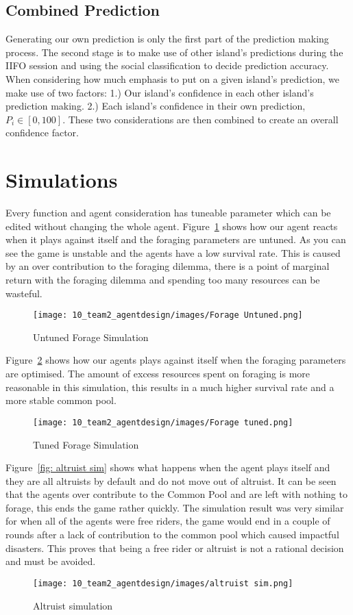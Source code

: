 \subsection{Combined Prediction}
Generating our own prediction is only the first part of the prediction making process. The second stage is to make use of other island's predictions during the IIFO session and using the social classification to decide prediction accuracy. When considering how much emphasis to put on a given island's prediction, we make use of two factors: 1.) Our island's confidence in each other island's prediction making. 2.) Each island's confidence in their own prediction, $P_i \in [0,100]$. These two considerations are then combined to create an overall confidence factor.

\section{Simulations}
Every function and agent consideration has tuneable parameter which can be edited without changing the whole agent. Figure~\ref{fig: Forage Untuned} shows how our agent reacts when it plays against itself and the foraging parameters are untuned. As you can see the game is unstable and the agents have a low survival rate. This is caused by an over contribution to the foraging dilemma, there is a point of marginal return with the foraging dilemma and spending too many resources can be wasteful. 

\begin{figure}[!htb]
    \centering
    \texttt{[image: 10\_team2\_agentdesign/images/Forage Untuned.png]}
    \caption{Untuned Forage Simulation}
    \label{fig: Forage Untuned}
\end{figure}

Figure~\ref{fig: Forage tuned} shows how our agents plays against itself when the foraging parameters are optimised. The amount of excess resources spent on foraging is more reasonable in this simulation, this results in a much higher survival rate and a more stable common pool.

\begin{figure}[!htb]
    \centering
    \texttt{[image: 10\_team2\_agentdesign/images/Forage tuned.png]}
    \caption{Tuned Forage Simulation}
    \label{fig: Forage tuned}
\end{figure}

Figure~\ref{fig: altruist sim}  shows what happens when the agent plays itself and they are all altruists by default and do not move out of altruist. It can be seen that the agents over contribute to the Common Pool and are left with nothing to forage, this ends the game rather quickly. The simulation result was very similar for when all of the agents were free riders, the game would end in a couple of rounds after a lack of contribution to the common pool which caused impactful disasters.  This proves that being a free rider or altruist is not a rational decision and must be avoided. 

\begin{figure}[!htb]
    \centering
    \texttt{[image: 10\_team2\_agentdesign/images/altruist sim.png]}
    \caption{Altruist simulation}
    \label{fig:  altruist sim}
\end{figure}